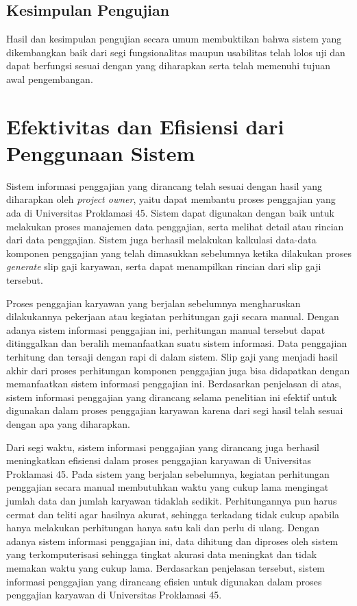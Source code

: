     \subsection{Kesimpulan Pengujian}
    Hasil dan kesimpulan pengujian secara umum membuktikan bahwa sistem yang dikembangkan baik dari segi fungsionalitas maupun usabilitas telah lolos uji dan dapat berfungsi sesuai dengan yang diharapkan serta telah memenuhi tujuan awal pengembangan.
    
\section{Efektivitas dan Efisiensi dari Penggunaan Sistem}
Sistem informasi penggajian yang dirancang telah sesuai dengan hasil yang diharapkan oleh \emph{project owner}, yaitu dapat membantu proses penggajian yang ada di Universitas Proklamasi 45. Sistem dapat digunakan dengan baik untuk melakukan proses manajemen data penggajian, serta melihat detail atau rincian dari data penggajian. Sistem juga berhasil melakukan kalkulasi data-data komponen penggajian yang telah dimasukkan sebelumnya ketika dilakukan proses \emph{generate} slip gaji karyawan, serta dapat menampilkan rincian dari slip gaji tersebut.
    
    Proses penggajian karyawan yang berjalan sebelumnya mengharuskan dilakukannya pekerjaan atau kegiatan perhitungan gaji secara manual. Dengan adanya sistem informasi penggajian ini, perhitungan manual tersebut dapat ditinggalkan dan beralih memanfaatkan suatu sistem informasi. Data penggajian terhitung dan tersaji dengan rapi di dalam sistem. Slip gaji yang menjadi hasil akhir dari proses perhitungan komponen penggajian juga bisa didapatkan dengan memanfaatkan sistem informasi penggajian ini. Berdasarkan penjelasan di atas, sistem informasi penggajian yang dirancang selama penelitian ini efektif untuk digunakan dalam proses penggajian karyawan karena dari segi hasil telah sesuai dengan apa yang diharapkan.
    
    Dari segi waktu, sistem informasi penggajian yang dirancang juga berhasil meningkatkan efisiensi dalam proses penggajian karyawan di Universitas Proklamasi 45. Pada sistem yang berjalan sebelumnya, kegiatan perhitungan penggajian secara manual membutuhkan waktu yang cukup lama mengingat jumlah data dan jumlah karyawan tidaklah sedikit. Perhitungannya pun harus cermat dan teliti agar hasilnya akurat, sehingga terkadang tidak cukup apabila hanya melakukan perhitungan hanya satu kali dan perlu di ulang. Dengan adanya sistem informasi penggajian ini, data dihitung dan diproses oleh sistem yang terkomputerisasi sehingga tingkat akurasi data meningkat dan tidak memakan waktu yang cukup lama. Berdasarkan penjelasan tersebut, sistem informasi penggajian yang dirancang efisien untuk digunakan dalam proses penggajian karyawan di Universitas Proklamasi 45.
    